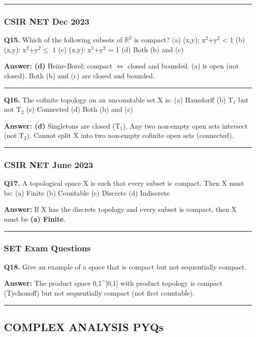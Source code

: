 \documentclass[12pt,a4paper,openany]{book}
\begin{document}
{{\bigskip\noindent\rule{\textwidth}{0.4pt}\bigskip

\subsubsection{CSIR NET Dec 2023}
\textbf{Q15.} Which of the following subsets of $\mathbb{R}^2$ is compact?
(a) {(x,y): x$^2$+y$^2$ < 1}  (b) {(x,y): x$^2$+y$^2\leq$ 1}  (c) {(x,y): x$^2$+y$^2$ = 1}  (d) Both (b) and (c)

\textbf{Answer: (d)} Heine-Borel: compact $\Longleftrightarrow$ closed and bounded. (a) is open (not closed). Both (b) and (c) are closed and bounded.

\bigskip\noindent\rule{\textwidth}{0.4pt}\bigskip

\textbf{Q16.} The cofinite topology on an uncountable set X is:
(a) Hausdorff  (b) T$_1$ but not T$_2$  (c) Connected  (d) Both (b) and (c)

\textbf{Answer: (d)} Singletons are closed (T$_1$). Any two non-empty open sets intersect (not T$_2$). Cannot split X into two non-empty cofinite open sets (connected).

\bigskip\noindent\rule{\textwidth}{0.4pt}\bigskip

\subsubsection{CSIR NET June 2023}
\textbf{Q17.} A topological space X is such that every subset is compact. Then X must be:
(a) Finite  (b) Countable  (c) Discrete  (d) Indiscrete

\textbf{Answer:} If X has the discrete topology and every subset is compact, then X must be \textbf{(a) Finite}.

\bigskip\noindent\rule{\textwidth}{0.4pt}\bigskip

\subsubsection{SET Exam Questions}
\textbf{Q18.} Give an example of a space that is compact but not sequentially compact.

\textbf{Answer:} The product space {0,1}^[0,1] with product topology is compact (Tychonoff) but not sequentially compact (not first countable).

\bigskip\noindent\rule{\textwidth}{0.4pt}\bigskip

\subsection{ COMPLEX ANALYSIS PYQs}

}}
\end{document}
